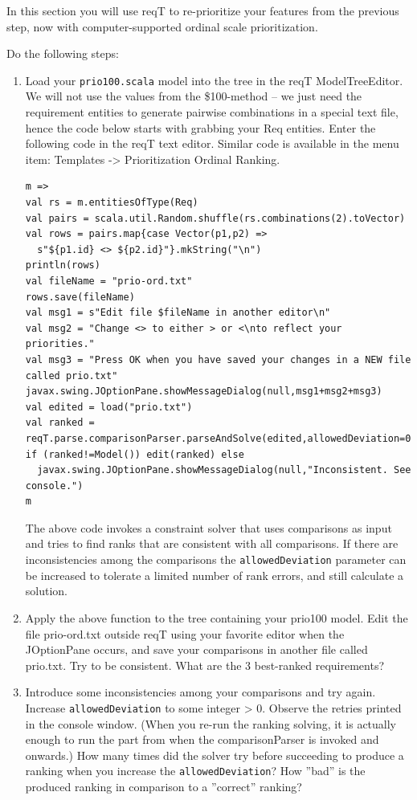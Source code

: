 \documentclass[11pt]{article}
\begin{document}
In this section you will use reqT to re-prioritize your features from the previous step, now with computer-supported ordinal scale prioritization. 
\begin{framed}
\noindent Do the following steps: 

\begin{enumerate}
\item Load your \verb+prio100.scala+ model into the tree in the reqT ModelTreeEditor. We will not use the values from the \$100-method -- we just need the requirement entities to generate pairwise combinations in a special text file, hence the code below starts with grabbing your Req entities. Enter the following code in the reqT text editor. Similar code is available in the menu item:  Templates -> Prioritization Ordinal Ranking.
\begin{lstlisting}
m => 
val rs = m.entitiesOfType(Req)
val pairs = scala.util.Random.shuffle(rs.combinations(2).toVector)
val rows = pairs.map{case Vector(p1,p2) => 
  s"${p1.id} <> ${p2.id}"}.mkString("\n")
println(rows)
val fileName = "prio-ord.txt"
rows.save(fileName)
val msg1 = s"Edit file $fileName in another editor\n"
val msg2 = "Change <> to either > or <\nto reflect your priorities."
val msg3 = "Press OK when you have saved your changes in a NEW file called prio.txt"
javax.swing.JOptionPane.showMessageDialog(null,msg1+msg2+msg3)
val edited = load("prio.txt")
val ranked = reqT.parse.comparisonParser.parseAndSolve(edited,allowedDeviation=0)
if (ranked!=Model()) edit(ranked) else 
  javax.swing.JOptionPane.showMessageDialog(null,"Inconsistent. See console.")
m
\end{lstlisting}
The above code invokes a constraint solver that uses comparisons as input and tries to find ranks that are consistent with all comparisons. If there are inconsistencies among the comparisons the  \verb+allowedDeviation+ parameter can be increased to tolerate a limited number of rank errors, and still calculate a solution.
\item Apply the above function to the tree containing your prio100 model. Edit the file prio-ord.txt outside reqT using your favorite editor when the JOptionPane occurs, and save your comparisons in another file called prio.txt. Try to be consistent. What are the 3 best-ranked requirements?
\vspace{1em}
\item Introduce some inconsistencies among your comparisons and try again. Increase \verb+allowedDeviation+ to some integer > 0. Observe the retries printed in the console window. (When you re-run the ranking solving, it is actually enough to run the part from when the comparisonParser is invoked and onwards.) How many times did the solver try before succeeding to produce a ranking when you increase the \verb+allowedDeviation+? How ''bad'' is the produced ranking in comparison to a ''correct'' ranking?

\end{enumerate}
\end{framed}
\end{document}
